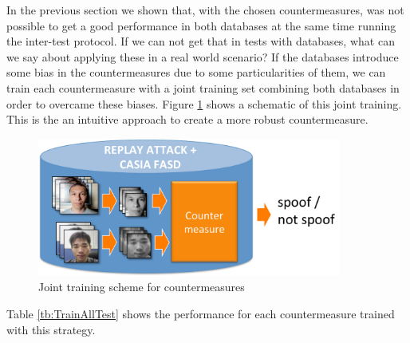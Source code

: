 In the previous section we shown that, with the chosen countermeasures, was not possible to get a good performance in both databases at the same time running the inter-test protocol. If we can not get that in tests with databases, what can we say about applying these in a real world scenario? If the databases introduce some bias in the countermeasures due to some particularities of them, we can train each countermeasure with a joint training set combining both databases in order to overcame these biases. Figure \ref{img:joint_training} shows a schematic of this joint training. This is the an intuitive approach to create a more robust countermeasure.

\begin{figure}[!htb]
\begin{center}
\includegraphics [width=10cm] {images/joint_training.pdf}
\caption{Joint training scheme for countermeasures} \label{img:joint_training}
\end{center}
\end{figure}



Table \ref{tb:TrainAllTest} shows the performance for each countermeasure trained with this strategy. %

